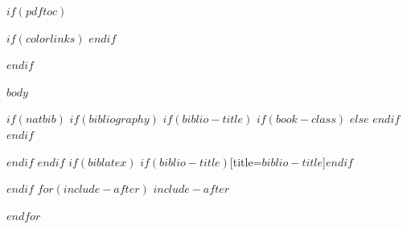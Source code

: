 \documentclass[$if(fontsize)$$fontsize$,$endif$$if(lang)$$babel-lang$,$endif$$if(papersize)$$papersize$paper,$endif$$for(classoption)$$classoption$$sep$,$endfor$]{article}
\begin{document}
$if(pdftoc)$
{
$if(colorlinks)$
\hypersetup{linkcolor=$if(toccolor)$$toccolor$$else$black$endif$}
$endif$
\setcounter{tocdepth}{$toc-depth$}
\tableofcontents
{}
}
$endif$

\newpage
{}
$body$

$if(natbib)$
$if(bibliography)$
$if(biblio-title)$
$if(book-class)$
\renewcommand\bibname{$biblio-title$}
$else$
\renewcommand\refname{$biblio-title$}
$endif$
$endif$
\newpage


$endif$
$endif$
$if(biblatex)$
\newpage
\printbibliography$if(biblio-title)$[title=$biblio-title$]$endif$

$endif$
$for(include-after)$
$include-after$

$endfor$
\end{document}
